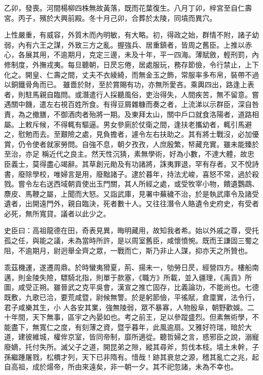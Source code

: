 \begin{pinyinscope}
 乙卯，發喪。河間楊柳四株無故黃落，既而花葉復生。八月丁卯，梓宮至自仁壽宮。丙子，殯於大興前殿。冬十月己卯，合葬於太陵，同墳而異穴。



 上性嚴重，有威容，外質木而內明敏，有大略。初，得政之始，群情不附，諸子幼弱，內有六王之謀，外致三方之亂。握強兵、居重鎮者，皆周之舊臣。上推以赤心，各展其用，不逾期月，克定三邊，未及十年，平一四海。薄賦斂，輕刑罰，內修制度，外撫戎夷。每旦聽朝，日昃忘倦，居處服玩，務存節儉，令行禁止，上下化之。開皇、仁壽之間，丈夫不衣綾綺，而無金玉之飾，常服率多布帛，裝帶不過以銅鐵骨角而已。
 雖嗇於財，至於賞賜有功，亦無所愛吝。乘輿四出，路逢上表者，則駐馬親自臨問。或潛遣行人採聽風俗，吏治得失，人間疾苦，無不留意。嘗遇關中饑，遣左右視百姓所食。有得豆屑雜糠而奏之者，上流涕以示群臣，深自咎責，為之撤膳，不御酒肉者殆將一期。及東拜太山，關中戶口就食洛陽者，道路相屬。上敕斥候，不得輒有驅逼。男女參廁於仗衛之間，逢扶老攜幼者，輒引馬避之，慰勉而去。至艱險之處，見負擔者，遽令左右扶助之。其有將士戰沒，必加優賞，仍令使者就家勞問。自強不息，朝夕孜孜，人庶殷繁，帑藏充實。雖未能臻於至治，亦足
 稱近代之良主。然天性沉猜，素無學術，好為小數，不達大體，故忠臣義士，莫得盡心竭辭。其草創元勛及有功諸將，誅夷罪退，罕有存者。又不悅詩書，廢除學校，唯婦言是用，廢黜諸子。逮於暮年，持法尤峻，喜怒不常，過於殺戮。嘗令左右送西域朝貢使出玉門關，其人所經之處，或受牧宰小物，饋遺鸚鵡、麖皮、馬鞭之屬，上聞而大怒。又詣武庫，見署中蕪穢不治，於是執武庫令及諸受遺者，出開遠門外，親自臨決，死者數十人。又往往潛令人賂遺令史府史，有受者必死，無所寬貸。議者以此少之。



 史臣曰：高祖龍德在田，奇表見異，晦明藏用，故知我者希。始以外戚之尊，受托孤之任，與能之議，未為當時所許，是以周室舊臣，咸懷憤惋。既而王謙固三蜀之阻，不逾期月，尉迥舉全齊之眾，一戰而亡，斯乃非止人謀，抑亦天之所贊也。



 乖茲機運，遂遷周鼎。於時蠻夷猾夏，荊、揚未一，劬勞日昃，經營四方。樓船南邁，則金陵失險，驃騎北指，則單于款塞，《職方》所載，並入疆理，《禹貢》所圖，咸受正朔。雖晉武之克平吳會，漢宣之推亡固存，比義論功，不能尚也。七德既敷，九歌已洽，要荒咸暨，尉候無警。於是躬節儉，平徭賦，倉廩實，法令行，君子咸樂其生，小
 人各安其業，強無陵弱，眾不暴寡，人物殷阜，朝野歡娛。二十年間，天下無事，區宇之內晏如也。考之前王，足以參蹤盛烈。但素無術學，不能盡下，無寬仁之度，有刻薄之資，暨乎暮年，此風逾扇。又雅好符瑞，暗於大道，建彼維城，權侔京室，皆同帝制，靡所適從。聽哲婦之言，惑邪臣之說，溺寵廢嫡，托付失所。滅父子之道，開昆弟之隙，縱其尋斧，剪伐本枝。墳土未幹，子孫繼踵屠戮，松檟才列，天下已非隋有。惜哉！跡其衰怠之源，稽其亂亡之兆，起自高祖，成於煬帝，所由來遠矣，非一朝一夕。其不祀忽諸，未為不幸也。



\end{pinyinscope}